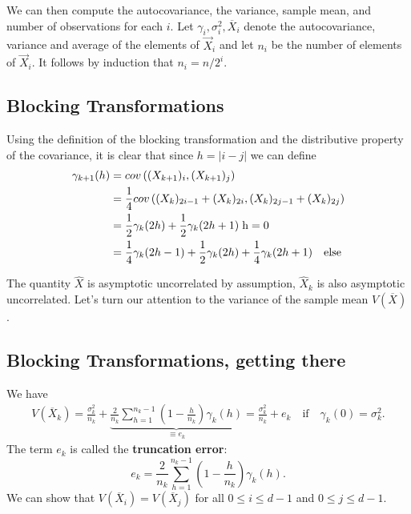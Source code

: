 We can then compute the autocovariance, the variance, sample mean, and
number of observations for each $i$. 
Let $\gamma_i, \sigma_i^2,
\overline{X}_i$ denote the autocovariance, variance and average of the
elements of $\vec{X}_i$ and let $n_i$ be the number of elements of
$\vec{X}_i$. It follows by induction that $n_i = n/2^i$. 

\subsection*{Blocking Transformations}

Using the
definition of the blocking transformation and the distributive
property of the covariance, it is clear that since $h =|i-j|$
we can define
\begin{align}
\gamma_{k+1}(h) &= cov\left( ({X}_{k+1})_{i}, ({X}_{k+1})_{j} \right) \nonumber \\
&=  \frac{1}{4}cov\left( ({X}_{k})_{2i-1} + ({X}_{k})_{2i}, ({X}_{k})_{2j-1} + ({X}_{k})_{2j} \right) \nonumber \\
&=  \frac{1}{2}\gamma_{k}(2h) + \frac{1}{2}\gamma_k(2h+1) \hspace{0.1cm} \mathrm{h = 0} \\
&=\frac{1}{4}\gamma_k(2h-1) + \frac{1}{2}\gamma_k(2h) + \frac{1}{4}\gamma_k(2h+1) \quad \mathrm{else}
\end{align}

The quantity $\hat{X}$ is asymptotic uncorrelated by assumption, $\hat{X}_k$ is also asymptotic uncorrelated. Let's turn our attention to the variance of the sample mean $V(\overline{X})$. 

\subsection*{Blocking Transformations, getting there}
We have
\begin{align}
V(\overline{X}_k) = \frac{\sigma_k^2}{n_k} + \underbrace{\frac{2}{n_k} \sum_{h=1}^{n_k-1}\left( 1 - \frac{h}{n_k} \right)\gamma_k(h)}_{\equiv e_k} = \frac{\sigma^2_k}{n_k} + e_k \quad \text{if} \quad \gamma_k(0) = \sigma_k^2. 
\end{align}
The term $e_k$ is called the \textbf{truncation error}: 
\begin{equation}
e_k = \frac{2}{n_k} \sum_{h=1}^{n_k-1}\left( 1 - \frac{h}{n_k} \right)\gamma_k(h). 
\end{equation}
We can show that $V(\overline{X}_i) = V(\overline{X}_j)$ for all $0 \leq i \leq d-1$ and $0 \leq j \leq d-1$. 


